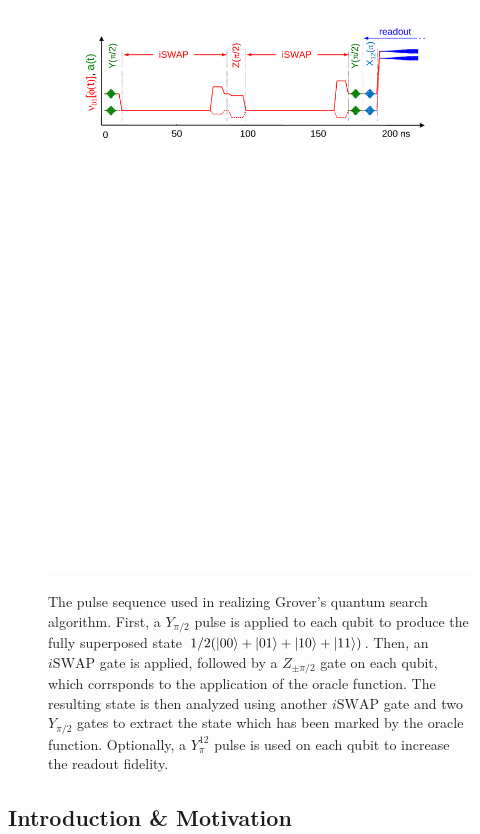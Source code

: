 \begin{figure}
	\centering
		\includegraphics[width=1.\textwidth]{./material/papers/grover/figures/grover_algorithm_pulse_sequence}
	\label{fig:Grover3}
	\caption[Pulse sequence used for implementing Grovers search algorithm]{The pulse sequence used in realizing Grover's quantum search algorithm. First, a $Y_{\pi/2}$ pulse is applied to each qubit to produce the fully superposed state $1/2(\left| 00 \right>+\left| 01 \right>+\left| 10 \right>+\left| 11 \right>)$. Then, an $i\mathrm{SWAP}$ gate is applied, followed by a $Z_{\pm \pi /2}$ gate on each qubit, which corrsponds to the application of the oracle function. The resulting state is then analyzed using another $i\mathrm{SWAP}$ gate and two $Y_{\pi/2}$ gates to extract the state which has been marked by the oracle function. Optionally, a $Y^{12}_{\pi}$ pulse is used on each qubit to increase the readout fidelity.}
\end{figure}

\subsection{Introduction \& Motivation}

